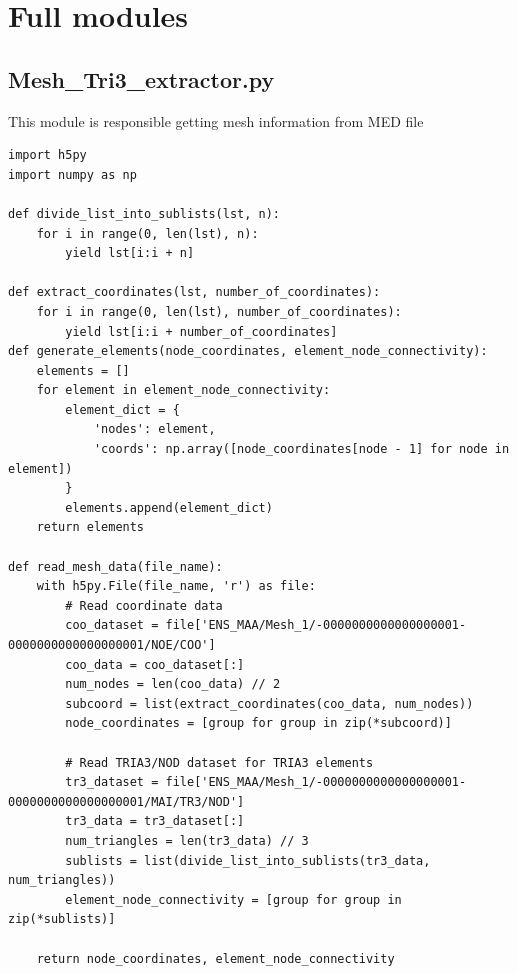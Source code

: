 \documentclass[12pt]{report}
\begin{document}
	\section{Full modules}
	\subsection{Mesh\_Tri3\_extractor.py}
	This module is responsible getting mesh information from MED file
	\begin{lstlisting}[style=mypython]
import h5py
import numpy as np

def divide_list_into_sublists(lst, n):
	for i in range(0, len(lst), n):
		yield lst[i:i + n]

def extract_coordinates(lst, number_of_coordinates):
	for i in range(0, len(lst), number_of_coordinates):
		yield lst[i:i + number_of_coordinates]
def generate_elements(node_coordinates, element_node_connectivity):
	elements = []
	for element in element_node_connectivity:
		element_dict = {
			'nodes': element,
			'coords': np.array([node_coordinates[node - 1] for node in element])
		}
		elements.append(element_dict)
	return elements
	
def read_mesh_data(file_name):
	with h5py.File(file_name, 'r') as file:
		# Read coordinate data
		coo_dataset = file['ENS_MAA/Mesh_1/-0000000000000000001-0000000000000000001/NOE/COO']
		coo_data = coo_dataset[:]
		num_nodes = len(coo_data) // 2
		subcoord = list(extract_coordinates(coo_data, num_nodes))
		node_coordinates = [group for group in zip(*subcoord)]
		
		# Read TRIA3/NOD dataset for TRIA3 elements
		tr3_dataset = file['ENS_MAA/Mesh_1/-0000000000000000001-0000000000000000001/MAI/TR3/NOD']
		tr3_data = tr3_dataset[:]
		num_triangles = len(tr3_data) // 3
		sublists = list(divide_list_into_sublists(tr3_data, num_triangles))
		element_node_connectivity = [group for group in zip(*sublists)]

	return node_coordinates, element_node_connectivity
	\end{lstlisting}
	
\end{document}

